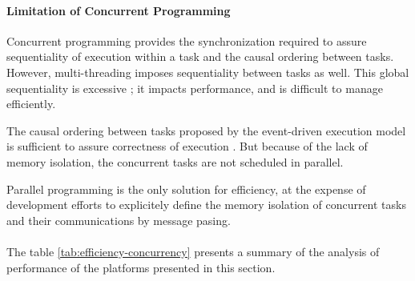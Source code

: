 \paragraph{Limitation of Concurrent Programming}




Concurrent programming provides the synchronization required to assure sequentiality of execution within a task and the causal ordering between tasks.
However, multi-threading imposes sequentiality between tasks as well.
This global sequentiality is excessive ; it impacts performance, and is difficult to manage efficiently.

The causal ordering between tasks proposed by the event-driven execution model is sufficient to assure correctness of execution \cite{Lamport1978,Reed2012}.
But because of the lack of memory isolation, the concurrent tasks are not scheduled in parallel.

Parallel programming is the only solution for efficiency, at the expense of development efforts to explicitely define the memory isolation of concurrent tasks and their communications by message pasing.


\paragraph{}

The table \ref{tab:efficiency-concurrency} presents a summary of the analysis of performance of the platforms presented in this section.






